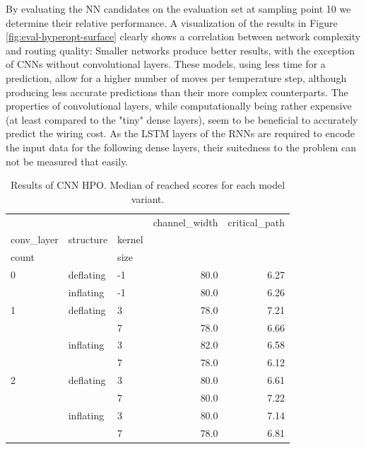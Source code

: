 By evaluating the \gls{NN} candidates on the evaluation set at sampling point 10 we determine their relative performance. A visualization of the results in Figure \ref{fig:eval-hyperopt-surface} clearly shows a correlation between network complexity and routing quality: Smaller networks produce better results, with the exception of \glspl{CNN} without convolutional layers. These models, using less time for a prediction, allow for a higher number of moves per temperature step, although producing less accurate predictions than their more complex counterparts. The properties of convolutional layers, while computationally being rather expensive (at least compared to the "tiny" dense layers), seem to be beneficial to accurately predict the wiring cost. As the \gls{LSTM} layers of the \glspl{RNN} are required to encode the input data for the following dense layers, their suitedness to the problem can not be measured that easily.

\begin{table}
	\begin{tabular}{lllrr}
		\toprule
		&           &   &  channel\_width &  critical\_path \\
		conv\_layer & structure & kernel &                &                   \\
		count &  & size &                &                   \\
		\midrule
		0 & deflating & -1 &           80.0 &           6.27 \\
		& inflating & -1 &           80.0 &           6.26 \\
		1 & deflating & 3 &           78.0 &           7.21 \\
		&           & 7 &           78.0 &           6.66 \\
		& inflating & 3 &           82.0 &           6.58 \\
		&           & 7 &           78.0 &           6.12 \\
		2 & deflating & 3 &           80.0 &           6.61 \\
		&           & 7 &           80.0 &           7.22 \\
		& inflating & 3 &           80.0 &           7.14 \\
		&           & 7 &           78.0 &           6.81 \\
		\bottomrule
	\end{tabular}
	\caption{Results of \gls{CNN} HPO. Median of reached scores for each model variant.}
	\label{table:cnn-hyperopt-results}
\end{table}

